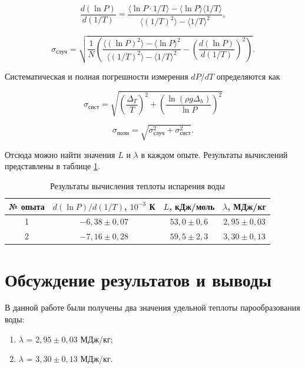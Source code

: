 \documentclass[a4paper,12pt]{article} %
\begin{document}
\begin{equation}
    \frac{d(\ln P)}{d(1/T)} = \frac{\langle \ln{P}\cdot 1/T\rangle-\langle \ln{P}\rangle \langle 1/T\rangle}{\langle (1/T)^2\rangle - \langle 1/T\rangle^2},
\end{equation}

\begin{equation}
    \sigma_\text{случ} = \sqrt{\frac{1}{N}\left(\frac{\langle (\ln{P})^2 \rangle - \langle \ln{P} \rangle^2}{\langle (1/T)^2 \rangle - \langle 1/T \rangle^2} - (\frac{d(\ln P)}{d(1/T)})^2 \right)}.
\end{equation}

Систематическая и полная погрешности измерения $dP/dT$ определяются как

\begin{equation}
    \sigma_\text{сист} = \sqrt{(\frac{\Delta_T}{T})^2 + (\frac{\ln(\rho g\Delta_h)}{\ln P})^2}
\end{equation}

\begin{equation}
    \sigma_\text{полн} = \sqrt{\sigma_\text{случ}^2 + \sigma_\text{сист}^2}.
\end{equation}

Отсюда можно найти значения $L$ и $\lambda$ в каждом опыте. Результаты вычислений представлены в таблице \ref{tab:results}.

\begin{table}[]
    \centering
    \begin{tabular}{|c|c|c|c|}\hline
        № опыта & $d(\ln P)/d(1/T)$, $10^{-3}$ К & $L$, кДж/моль & $\lambda$, МДж/кг \\ \hline
        1 & $-6,38 \pm 0,07$ & $53,0 \pm 0,6$ & $2,95 \pm 0,03$ \\ \hline
        2 & $-7,16 \pm 0,28$ & $59,5 \pm 2,3$ & $3,30 \pm 0,13$ \\ \hline
    \end{tabular}
    \caption{Результаты вычисления теплоты испарения воды}
    \label{tab:results}
\end{table}

\section{Обсуждение результатов и выводы}

В данной работе были получены два значения удельной теплоты парообразования воды:

\begin{enumerate}
    \item $\lambda$ = $2,95 \pm 0,03$ МДж/кг;
    \item $\lambda$ = $3,30 \pm 0,13$ МДж/кг.
\end{enumerate}
\end{document}
